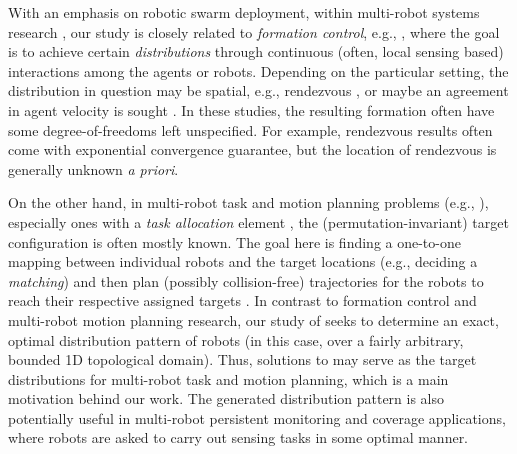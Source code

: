 With an emphasis on robotic swarm deployment, within multi-robot 
systems research \cite{arai2002advances,gerkey2004formal,ren2008distributed,bullo2009distributed}, 
our study is closely related to {\em formation control}, e.g., 
\cite{ando1999distributed,jadbabaie2003coordination,olfati2004consensus,ren2005consensus,cheng2008almost,mesbahi2010graph,yu2012rendezvous},
where the goal is to achieve certain {\em distributions} through 
continuous (often, local sensing based) interactions among the 
agents or robots. Depending on the particular setting, the 
distribution in question may be spatial, e.g., rendezvous
\cite{ando1999distributed,yu2012rendezvous}, or maybe an agreement 
in agent velocity is sought \cite{jadbabaie2003coordination,ren2005consensus}. 
In these studies, the resulting formation often have some 
degree-of-freedoms left unspecified. For example, rendezvous 
results \cite{ando1999distributed,yu2012rendezvous} often come 
with exponential convergence guarantee, but the location of
rendezvous is generally unknown {\em a priori}. 

On the other hand, in multi-robot task and motion planning problems (e.g.,
\cite{smith2009monotonic,ayanian2010decentralized,liu2011multi,liu2013optimal,turpin2014goal,turpin2014capt,alonso2015multi,SolYu15}), 
especially ones with a {\em task allocation} element 
\cite{smith2009monotonic,liu2011multi,liu2013optimal,turpin2014goal,turpin2014capt,SolYu15},
the (permutation-invariant) target configuration is often mostly 
known. The goal here is finding a one-to-one mapping between individual 
robots and the target locations (e.g., deciding a {\em matching}) and 
then plan (possibly collision-free) trajectories for the robots to reach 
their respective assigned targets \cite{turpin2014goal,turpin2014capt,SolYu15}.  
In contrast to formation control and multi-robot motion planning research, 
our study of \opg seeks to determine an exact, optimal distribution 
pattern of robots (in this case, over a fairly arbitrary, bounded 1D 
topological domain). Thus, solutions to \opg may serve as the target 
distributions for multi-robot task and motion planning, which is a main 
motivation behind our work. The generated distribution pattern is 
also potentially useful in multi-robot persistent monitoring 
\cite{soltero2014decentralized} and coverage \cite{howard2002mobile,schwager2009optimal} 
applications, where robots are asked to carry out sensing tasks in some 
optimal manner. 
	
